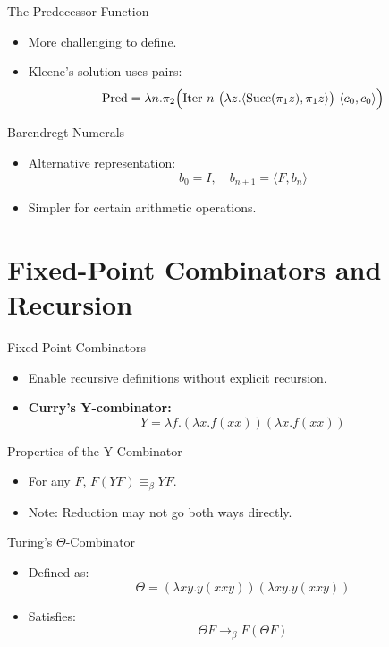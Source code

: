 \documentclass{beamer}
\begin{document}
\begin{frame}{The Predecessor Function}
  \begin{itemize}
    \item More challenging to define.
    \item Kleene’s solution uses pairs:
      \[
      \text{Pred} = \lambda n. \pi_2 \Bigl( \text{Iter}\ n\ \bigl(\lambda z. \langle \text{Succ}(\pi_1 z),\pi_1 z \rangle\bigr)\ \langle c_0, c_0 \rangle \Bigr)
      \]
  \end{itemize}
\end{frame}

\begin{frame}{Barendregt Numerals}
  \begin{itemize}
    \item Alternative representation: 
      \[
      b_0 = I,\quad b_{n+1} = \langle F, b_n \rangle
      \]
    \item Simpler for certain arithmetic operations.
  \end{itemize}
\end{frame}

\section{Fixed-Point Combinators and Recursion}
\begin{frame}{Fixed-Point Combinators}
  \begin{itemize}
    \item Enable recursive definitions without explicit recursion.
    \item \textbf{Curry's Y-combinator:}
      \[
      Y = \lambda f. (\lambda x. f (x x)) (\lambda x. f (x x))
      \]
  \end{itemize}
\end{frame}

\begin{frame}{Properties of the Y-Combinator}
  \begin{itemize}
    \item For any \(F\), \(F (Y F) \equiv_\beta Y F\).
    \item Note: Reduction may not go both ways directly.
  \end{itemize}
\end{frame}

\begin{frame}{Turing's $\Theta$-Combinator}
  \begin{itemize}
    \item Defined as:
      \[
      \Theta = (\lambda x y. y(x x y)) (\lambda x y. y(x x y))
      \]
    \item Satisfies:
      \[
      \Theta F \rightarrow_\beta F (\Theta F)
      \]
  \end{itemize}
\end{frame}
\end{document}
